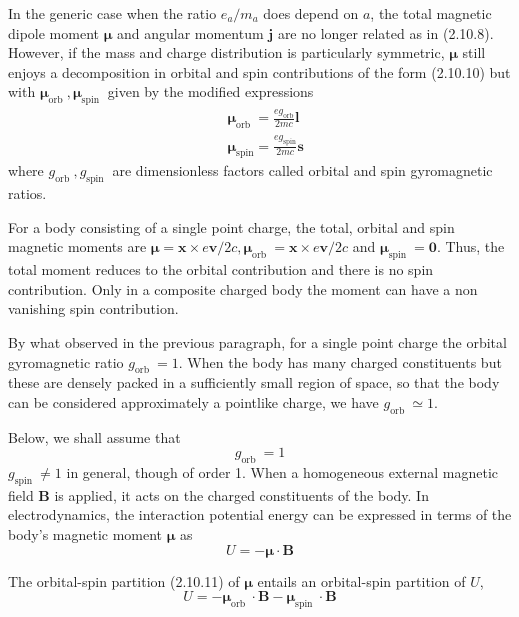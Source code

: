 \documentclass{article}
\begin{document}
In the generic case when the ratio $e_{a} / m_{a}$ does depend on $a$, the total magnetic dipole moment $\boldsymbol{\mu}$ and angular momentum $\boldsymbol{j}$ are no longer related as in (2.10.8). However, if the mass and charge distribution is particularly symmetric, $\boldsymbol{\mu}$ still enjoys a decomposition in orbital and spin contributions of the form (2.10.10) but with $\boldsymbol{\mu}_{\text {orb }}, \boldsymbol{\mu}_{\text {spin }}$ given by the modified expressions
$$
\begin{align*}
& \boldsymbol{\mu}_{\text {orb }}=\frac{e g_{\mathrm{orb}}}{2 m c} \boldsymbol{l}  \tag{2.10.13}\\
& \boldsymbol{\mu}_{\mathrm{spin}}=\frac{e g_{\mathrm{spin}}}{2 m c} \boldsymbol{s} \tag{2.10.14}
\end{align*}
$$
where $g_{\text {orb }}, g_{\text {spin }}$ are dimensionless factors called orbital and spin gyromagnetic ratios.

For a body consisting of a single point charge, the total, orbital and spin magnetic moments are $\boldsymbol{\mu}=\boldsymbol{x} \times e \boldsymbol{v} / 2 c, \boldsymbol{\mu}_{\text {orb }}=\boldsymbol{x} \times e \boldsymbol{v} / 2 c$ and $\boldsymbol{\mu}_{\text {spin }}=\mathbf{0}$. Thus, the total moment reduces to the orbital contribution and there is no spin contribution. Only in a composite charged body the moment can have a non vanishing spin contribution.

By what observed in the previous paragraph, for a single point charge the orbital gyromagnetic ratio $g_{\text {orb }}=1$. When the body has many charged constituents but these are densely packed in a sufficiently small region of space, so that the body can be considered approximately a pointlike charge, we have $g_{\text {orb }} \simeq 1$.

Below, we shall assume that
$$
\begin{equation*}
g_{\text {orb }}=1 \tag{2.10.15}
\end{equation*}
$$
$g_{\text {spin }} \neq 1$ in general, though of order 1.
When a homogeneous external magnetic field $\boldsymbol{B}$ is applied, it acts on the charged constituents of the body. In electrodynamics, the interaction potential energy can be expressed in terms of the body's magnetic moment $\boldsymbol{\mu}$ as
$$
\begin{equation*}
U=-\boldsymbol{\mu} \cdot \boldsymbol{B} \tag{2.10.16}
\end{equation*}
$$

The orbital-spin partition (2.10.11) of $\boldsymbol{\mu}$ entails an orbital-spin partition of $U$,
$$
\begin{equation*}
U=-\boldsymbol{\mu}_{\text {orb }} \cdot \boldsymbol{B}-\boldsymbol{\mu}_{\text {spin }} \cdot \boldsymbol{B} \tag{2.10.17}
\end{equation*}
$$
\end{document}
